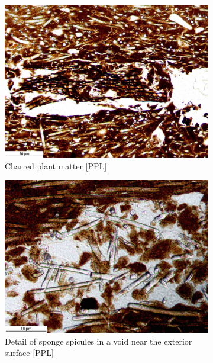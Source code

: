 \documentclass[a4paper]{article}
\begin{document}
\begin{figure}[H]
	\begin{subfigure}[t]{.49\textwidth}
		\includegraphics[width=\textwidth]{ThinSections/43-9_10x_PPL.jpg}
		\caption{Charred plant matter [PPL]}
	\end{subfigure}\hspace{.5em}\hfill
	\begin{subfigure}[t]{.49\textwidth}
		\includegraphics[width=\textwidth]{ThinSections/43-3_20x_PPL.jpg}
		\caption{Detail of sponge spicules in a void near the exterior surface [PPL]}
	\end{subfigure}
	\caption{}
	\label{fig:43_snp}
\end{figure}
\end{document}
